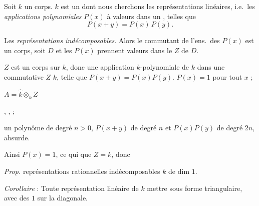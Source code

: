 \documentclass[11pt,a4paper]{article}
\begin{document}


Soit $k$ un corps. $k$ est un  dont \ill{} nous
cherchons les représentations linéaires, i.e.\ les \emph{applications
polynomiales} $P(x)$ à valeurs dans un \ill{}, telles que
\[ P(x+y) = P(x)\,P(y) . \]

Les \emph{représentations indécomposables}. Alors le commutant de l'ens.\ des
$P(x)$ est un corps, \struck{\ill{}} soit $D$ et les $P(x)$ prennent \ill{}
valeurs dans le  $Z$ de $D$.

$Z$ est un corps  \ill{} sur $k$, donc \ill{} une
application $k$-polynomiale de $k$ dans une \struck{\ill{}} \ill{} commutative
$Z$  $k$, telle que $P(x+y) = P(x)P(y)$. 
\ill{} $P(x) = 1$ pour tout $x$ ; 

 \qquad $A = \hat{k} \otimes_{k} Z$

,
,  ;




\ill{} un polynôme de degré $n > 0$, $P(x+y)$ \ill{} de degré $n$ et
$P(x)P(y)$ de degré $2n$, absurde.


Ainsi $P(x) = 1$, ce qui \ill{} que $Z = k$, donc

\emph{Prop.}   représentations 
rationnelles indécomposables \ill{} $k$ \ill{} de dim $1$.

\emph{Corollaire} : Toute représentation linéaire  de $k$
\ill{} \ill{} \ill{} mettre sous forme  triangulaire, avec des
$1$ sur la diagonale.
\end{document}
